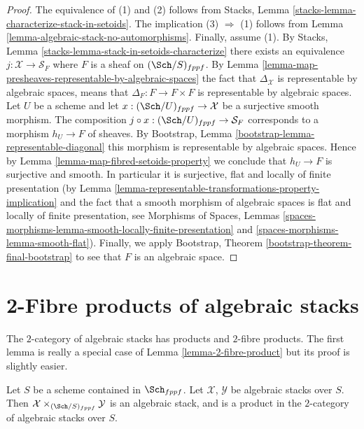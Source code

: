 \begin{proof}
The equivalence of (1) and (2) follows from
Stacks, Lemma \ref{stacks-lemma-characterize-stack-in-setoids}.
The implication (3) $\Rightarrow$ (1) follows from
Lemma \ref{lemma-algebraic-stack-no-automorphisms}.
Finally, assume (1). By
Stacks, Lemma \ref{stacks-lemma-stack-in-setoids-characterize}
there exists an equivalence $j : \mathcal{X} \to \mathcal{S}_F$
where $F$ is a sheaf on $(\Sch/S)_{fppf}$.  By
Lemma \ref{lemma-map-presheaves-representable-by-algebraic-spaces}
the fact that $\Delta_\mathcal{X}$ is representable by algebraic
spaces, means that $\Delta_F : F \to F \times F$
is representable by algebraic spaces.
Let $U$ be a scheme and let $x : (\Sch/U)_{fppf} \to \mathcal{X}$
be a surjective smooth morphism. The composition
$j \circ x : (\Sch/U)_{fppf} \to \mathcal{S}_F$
corresponds to a morphism $h_U \to F$ of sheaves. By
Bootstrap, Lemma \ref{bootstrap-lemma-representable-diagonal}
this morphism is representable by algebraic spaces.
Hence by
Lemma \ref{lemma-map-fibred-setoids-property}
we conclude that $h_U \to F$ is surjective and smooth.
In particular it is surjective, flat and locally of finite presentation
(by
Lemma \ref{lemma-representable-transformations-property-implication}
and the fact that a smooth morphism of algebraic spaces is flat and
locally of finite presentation, see
Morphisms of Spaces,
Lemmas \ref{spaces-morphisms-lemma-smooth-locally-finite-presentation} and
\ref{spaces-morphisms-lemma-smooth-flat}).
Finally, we apply
Bootstrap, Theorem \ref{bootstrap-theorem-final-bootstrap}
to see that $F$ is an algebraic space.
\end{proof}






\section{2-Fibre products of algebraic stacks}
\label{section-2-fibre-products}

\noindent
The $2$-category of algebraic stacks has products and $2$-fibre products.
The first lemma is really a special case of
Lemma \ref{lemma-2-fibre-product}
but its proof is slightly easier.

\begin{lemma}
\label{lemma-product-spaces}
Let $S$ be a scheme contained in $\Sch_{fppf}$.
Let $\mathcal{X}$, $\mathcal{Y}$ be algebraic stacks over $S$.
Then $\mathcal{X} \times_{(\Sch/S)_{fppf}} \mathcal{Y}$
is an algebraic stack, and is a product in the $2$-category of
algebraic stacks over $S$.
\end{lemma}

